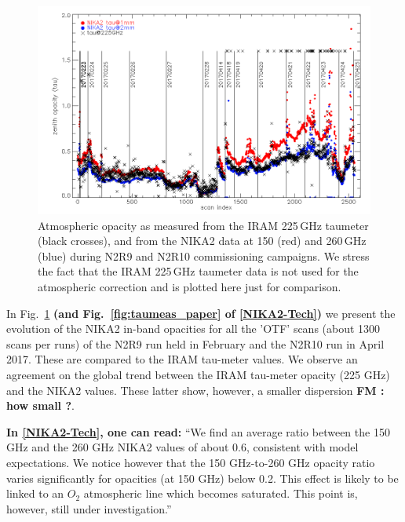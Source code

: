 \begin{figure}[ht]
\begin{center}
\includegraphics[width=\linewidth]{Figures/opacity_vs_index_N2R9_N2R10.png}
\caption{Atmospheric opacity as measured from the IRAM 225\,GHz
  taumeter (black crosses), and from the NIKA2 data at 150 (red) and 260\,GHz (blue) during 
  N2R9 and N2R10 commissioning campaigns.  We stress the fact that the IRAM 225\,GHz taumeter data is not used for the atmospheric correction and is plotted here just for comparison.
  \label{fig:taumeas}}
\end{center}
\end{figure}


In Fig.~\ref{fig:taumeas} {\bf(and Fig.~\ref{fig:taumeas_paper} of
  \ref{NIKA2-Tech}) } we present the evolution of the NIKA2 in-band
opacities for all the 'OTF' scans (about 1300 scans per runs) of the
N2R9 run held in February and the N2R10 run in April 2017. These are
compared to the IRAM tau-meter values. We observe an agreement on the global trend between the IRAM tau-meter opacity
(225 GHz) and the NIKA2 values. These latter show, however,
a smaller dispersion {\bf FM : how small ?}.


{\bf In  \ref{NIKA2-Tech}, one can read:}  
``We find an average ratio between the
150 GHz and the 260 GHz NIKA2 values of about
0.6, consistent with model expectations. We notice however that
the 150 GHz-to-260 GHz opacity ratio varies significantly for
opacities (at 150 GHz) below 0.2. This effect is likely to be
linked to an $O_2$ atmospheric line which becomes saturated. This
point is, however, still under investigation.''






